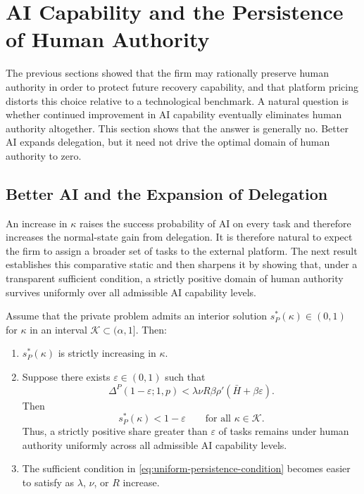 \section{AI Capability and the Persistence of Human Authority}
\label{sec:capability}

The previous sections showed that the firm may rationally preserve human authority in order to protect future recovery capability, and that platform pricing distorts this choice relative to a technological benchmark. A natural question is whether continued improvement in AI capability eventually eliminates human authority altogether. This section shows that the answer is generally no. Better AI expands delegation, but it need not drive the optimal domain of human authority to zero.

\subsection{Better AI and the Expansion of Delegation}
\label{subsec:better-ai}

An increase in $\kappa$ raises the success probability of AI on every task and therefore increases the normal-state gain from delegation. It is therefore natural to expect the firm to assign a broader set of tasks to the external platform. The next result establishes this comparative static and then sharpens it by showing that, under a transparent sufficient condition, a strictly positive domain of human authority survives uniformly over all admissible AI capability levels.

\begin{proposition}
\label{prop:better-ai-not-full}
Assume that the private problem admits an interior solution $s_P^\ast(\kappa)\in(0,1)$ for $\kappa$ in an interval $\mathcal{K}\subset(\alpha,1]$. Then:

\begin{enumerate}
\item $s_P^\ast(\kappa)$ is strictly increasing in $\kappa$.

\item Suppose there exists $\varepsilon\in(0,1)$ such that
\begin{equation}
\label{eq:uniform-persistence-condition}
\Delta^P(1-\varepsilon;1,p)
<
\lambda \nu R \beta \rho'(\bar H+\beta\varepsilon).
\end{equation}
Then
\[
s_P^\ast(\kappa)< 1-\varepsilon
\qquad
\text{for all } \kappa\in\mathcal{K}.
\]
Thus, a strictly positive share greater than $\varepsilon$ of tasks remains under human authority uniformly across all admissible AI capability levels.

\item The sufficient condition in \eqref{eq:uniform-persistence-condition} becomes easier to satisfy as $\lambda$, $\nu$, or $R$ increase.
\end{enumerate}
\end{proposition}

